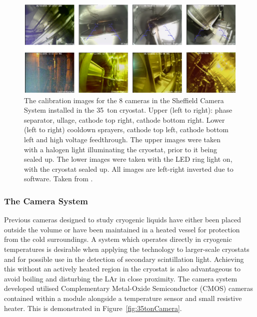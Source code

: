 \begin{figure}
  \centering
  \includegraphics[width=15cm]{35tonCamerasImages.pdf}
  \caption[The calibration images for the 8 cameras in the Sheffield Camera System installed in the 35~ton cryostat.]{The calibration images for the 8 cameras in the Sheffield Camera System installed in the 35~ton cryostat.  Upper (left to right): phase separator, ullage, cathode top right, cathode bottom right.  Lower (left to right) cooldown sprayers, cathode top left, cathode bottom left and high voltage feedthrough.  The upper images were taken with a halogen light illuminating the cryostat, prior to it being sealed up.  The lower images were taken with the LED ring light on, with the cryostat sealed up. All images are left-right inverted due to software.  Taken from \cite{35tonCameras2017}.}
  \label{fig:35tonCamerasImages}
\end{figure}

\subsubsection{The Camera System}\label{sec:35tonCameraSystem}

Previous cameras designed to study cryogenic liquids have either been placed outside the volume or have been maintained in a heated vessel for protection from the cold surroundings.  A system which operates directly in cryogenic temperatures is desirable when applying the technology to larger-scale cryostats and for possible use in the detection of secondary scintillation light.  Achieving this without an actively heated region in the cryostat is also advantageous to avoid boiling and disturbing the LAr in close proximity.  The camera system developed utilised Complementary Metal-Oxide Semiconductor (CMOS) cameras contained within a module alongside a temperature sensor and small resistive heater.  This is demonstrated in Figure~\ref{fig:35tonCamera}.

